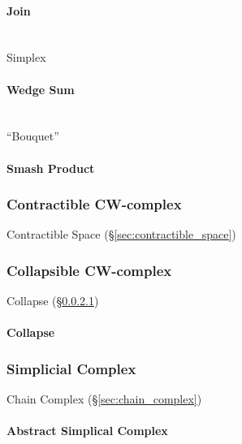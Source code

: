 \paragraph{Join}\label{sec:join}
\hfill \\

Simplex %



\paragraph{Wedge Sum}\label{sec:wedge_sum}
\hfill \\

``Bouquet''



\paragraph{Smash Product}\label{sec:smash_product}



\subsubsection{Contractible CW-complex}
\label{sec:contractible_cwcomplex}

Contractible Space (\S\ref{sec:contractible_space})



\subsubsection{Collapsible CW-complex}
\label{sec:collapsible_cwcomplex}

Collapse (\S\ref{sec:collapse})



\paragraph{Collapse}\label{sec:collapse}



\subsubsection{Simplicial Complex}\label{sec:simplicial_complex}

Chain Complex (\S\ref{sec:chain_complex})



\paragraph{Abstract Simplical Complex}\label{sec:abstract_complex}




